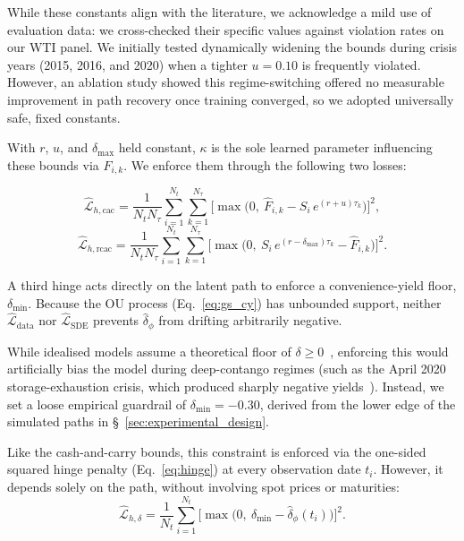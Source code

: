 \documentclass[11pt, a4paper]{article}
\begin{document}
While these constants align with the literature, we acknowledge a mild use of evaluation data: we cross-checked their specific values against violation rates on our WTI panel. We initially tested dynamically widening the bounds during crisis years (2015, 2016, and 2020) when a tighter $u=0.10$ is frequently violated. However, an ablation study showed this regime-switching offered no measurable improvement in path recovery once training converged, so we adopted universally safe, fixed constants.

With $r$, $u$, and $\delta_{\max}$ held constant, $\kappa$ is the sole learned parameter influencing these bounds via $\hat{F}_{i,k}$. We enforce them through the following two losses:


\begin{equation}
\hat{\mathcal{L}}_{h,\text{cac}} = \frac{1}{N_t N_\tau} \sum_{i=1}^{N_t} \sum_{k=1}^{N_\tau}
\Big[ \max\!\Big( 0,\ \hat{F}_{i,k} - S_i\, e^{(r+u)\tau_k} \Big)
\Big]^2,
\label{eq:cac-loss}
\end{equation}
\begin{equation}
\hat{\mathcal{L}}_{h,\text{rcac}} = \frac{1}{N_t N_\tau} \sum_{i=1}^{N_t} \sum_{k=1}^{N_\tau}
\Big[ \max\!\Big( 0,\ S_i\, e^{(r - \delta_{\max})\tau_k}
- \hat{F}_{i,k} \Big) \Big]^2.
\label{eq:rcac-loss}
\end{equation}

A third hinge acts directly on the latent path to enforce a convenience-yield floor, $\delta_{\min}$. Because the OU process (Eq.~\ref{eq:gs_cy}) has unbounded support, neither $\hat{\mathcal{L}}_{\text{data}}$ nor $\hat{\mathcal{L}}_{\text{SDE}}$ prevents $\hat{\delta}_\phi$ from drifting arbitrarily negative.

While idealised models assume a theoretical floor of $\delta \geq 0$~\cite{Liu2009No-ArbitrageStructures}, enforcing this would artificially bias the model during deep-contango regimes (such as the April 2020 storage-exhaustion crisis, which produced sharply negative yields~\cite{Reuters2020, CME2020}). Instead, we set a loose empirical guardrail of $\delta_{\min} = -0.30$, derived from the lower edge of the simulated paths in \S~\ref{sec:experimental_design}.

Like the cash-and-carry bounds, this constraint is enforced via the one-sided squared hinge penalty (Eq.~\ref{eq:hinge}) at every observation date $t_i$. However, it depends solely on the path, without involving spot prices or maturities:
\begin{equation}
\hat{\mathcal{L}}_{h,\delta} = \frac{1}{N_t} \sum_{i=1}^{N_t}
\Big[ \max\!\Big( 0,\ \delta_{\min} - \hat{\delta}_\phi(t_i) \Big) \Big]^2.
\label{eq:delta-floor-loss}
\end{equation}
\end{document}

